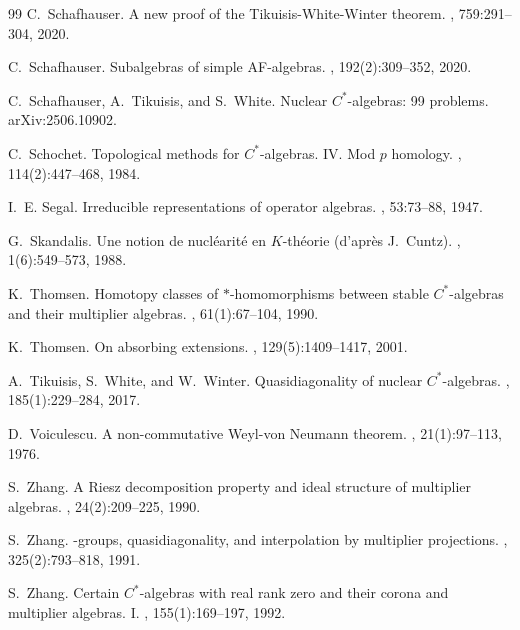 \documentclass[reqno]{amsart}
\theoremstyle{definition}
\theoremstyle{remark}
\numberwithin{equation}{section}
\theoremstyle{definition}
\begin{document}
\begin{thebibliography}{99}
C.~Schafhauser.
\newblock A new proof of the {T}ikuisis-{W}hite-{W}inter theorem.
, 759:291--304, 2020.

C.~Schafhauser.
\newblock Subalgebras of simple {AF}-algebras.
, 192(2):309--352, 2020.

C.~Schafhauser, A.~Tikuisis, and S.~White.
\newblock Nuclear {$C^*$}-algebras: 99 problems.
\newblock arXiv:2506.10902.

C.~Schochet.
\newblock Topological methods for {$C^{\ast} $}-algebras. {IV}. {M}od {$p$}
  homology.
, 114(2):447--468, 1984.

I.~E. Segal.
\newblock Irreducible representations of operator algebras.
, 53:73--88, 1947.

G.~Skandalis.
\newblock Une notion de nucl\'earit\'e{} en {$K$}-th\'eorie (d'apr\`es {J}.\
  {C}untz).
, 1(6):549--573, 1988.

K.~Thomsen.
\newblock Homotopy classes of {$*$}-homomorphisms between stable
  {$C^*$}-algebras and their multiplier algebras.
, 61(1):67--104, 1990.

K.~Thomsen.
\newblock On absorbing extensions.
, 129(5):1409--1417, 2001.

A.~Tikuisis, S.~White, and W.~Winter.
\newblock Quasidiagonality of nuclear {$C^\ast$}-algebras.
, 185(1):229--284, 2017.

D.~Voiculescu.
\newblock A non-commutative {W}eyl-von {N}eumann theorem.
, 21(1):97--113, 1976.

S.~Zhang.
\newblock A {R}iesz decomposition property and ideal structure of multiplier
  algebras.
, 24(2):209--225, 1990.

S.~Zhang.
-groups, quasidiagonality, and interpolation by multiplier
  projections.
, 325(2):793--818, 1991.

S.~Zhang.
\newblock Certain {$C^\ast$}-algebras with real rank zero and their corona and
  multiplier algebras. {I}.
, 155(1):169--197, 1992. 


\end{thebibliography}
\end{document}
